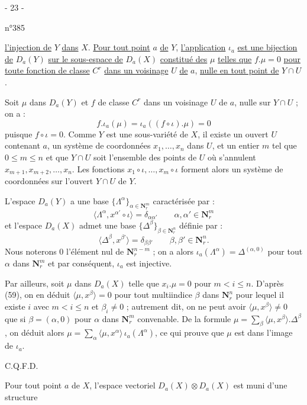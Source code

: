 \begin{center}- 23 -\end{center}
\begin{flushright}n°385\end{flushright}

\uline{l'injection de} $Y$ \uline{dans} $X$. \uline{Pour tout point} $a$ \uline{de} $Y$, \uline{l'application} $\iota_a$ \uline{est une bijection de} $D_a(Y)$ \uline{sur le sous-espace de} $D_a(X)$ \uline{constitué des} $\mu$ \uline{telles que} $f.\mu=0$ \uline{pour toute fonction de classe} $C^r$ \uline{dans un voisinage} $U$ \uline{de} $a$, \uline{nulle en tout point de} $Y\cap U$.

Soit $\mu$ dans $D_a(Y)$ et $f$ de classe $C^r$ dans un voisinage $U$ de $a$, nulle sur $Y\cap U$ ; on a :
\[
f.\iota_a(\mu)=\iota_a((f\circ\iota).\mu)=0
\]
puisque $f\circ\iota=0$. Comme $Y$ est une sous-variété de $X$, il existe un ouvert $U$ contenant $a$, un système de coordonnées $x_1,\ldots,x_n$ dans $U$, et un entier $m$ tel que $0\leq m\leq n$ et que $Y\cap U$ soit l'ensemble des points de $U$ où s'annulent $x_{m+1},x_{m+2},\ldots,x_n$. Les fonctions $x_1\circ\iota,\ldots,x_m\circ\iota$ forment alors un système de coordonnées sur l'ouvert $Y\cap U$ de $Y$.

L'espace $D_a(Y)$ a une base $\{\Lambda^\alpha\}_{\alpha\in\mathbf{N}_r^m}$ caractérisée par :
\[
\langle\Lambda^\alpha,x^{\alpha'}\circ\iota\rangle=\delta_{\alpha\alpha'}
\qquad \alpha,\alpha'\in\mathbf{N}_r^m
\]
et l'espace $D_a(X)$ admet une base $\{\Delta^\beta\}_{\beta\in\mathbf{N}_r^n}$ définie par :
\[
\langle\Delta^\beta,x^{\beta'}\rangle=\delta_{\beta\beta'}
\qquad \beta,\beta'\in\mathbf{N}_r^n.
\]
Nous noterons $0$ l'élément nul de $\mathbf{N}_r^{n-m}$ ; on a alors $\iota_a(\Lambda^\alpha)=\Delta^{(\alpha,0)}$ pour tout $\alpha$ dans $\mathbf{N}_r^m$ et par conséquent, $\iota_a$ est injective.

Par ailleurs, soit $\mu$ dans $D_a(X)$ telle que $x_i.\mu=0$ pour $m<i\leq n$. D'après (59), on en déduit $\langle\mu,x^\beta\rangle=0$ pour tout multiindice $\beta$ dans $\mathbf{N}_r^n$ pour lequel il existe $i$ avec $m<i\leq n$ et $\beta_i\neq0$ ; autrement dit, on ne peut avoir $\langle\mu,x^\beta\rangle\neq0$ que si $\beta=(\alpha,0)$ pour $\alpha$ dans $\mathbf{N}_r^m$ convenable. De la formule $\mu=\sum_\beta\langle\mu,x^\beta\rangle.\Delta^\beta$, on déduit alors $\mu=\sum_\alpha\langle\mu,x^\alpha\rangle\,\iota_a(\Lambda^\alpha)$, ce qui prouve que $\mu$ est dans l'image de $\iota_a$.
\begin{flushright}C.Q.F.D.\end{flushright}

Pour tout point $a$ de $X$, l'espace vectoriel $D_a(X)\otimes D_a(X)$ est muni d'une structure
